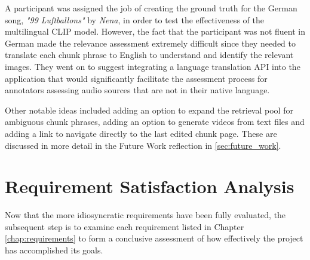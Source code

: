 \documentclass{l4proj}
\begin{document}
A participant was assigned the job of creating the ground truth for the German song, \emph{"99 Luftballons"} by \emph{Nena}, in order to test the effectiveness of the multilingual CLIP model. However, the fact that the participant was not fluent in German made the relevance assessment extremely difficult since they needed to translate each chunk phrase to English to understand and identify the relevant images. They went on to suggest integrating a language translation API into the application that would significantly facilitate the assessment process for annotators assessing audio sources that are not in their native language.

Other notable ideas included adding an option to expand the retrieval pool for ambiguous chunk phrases, adding an option to generate videos from text files and adding a link to navigate directly to the last edited chunk page. These are discussed in more detail in the Future Work reflection in \ref{sec:future_work}.


\section{Requirement Satisfaction Analysis}
Now that the more idiosyncratic requirements have been fully evaluated, the subsequent step is to examine each requirement listed in Chapter \ref{chap:requirements} to form a conclusive assessment of how effectively the project has accomplished its goals.
\end{document}
